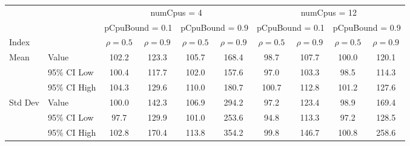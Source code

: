 \begin{tabular}{llc|c|c|c|c|c|c|c}
\toprule
& & \multicolumn{4}{c|}{numCpus = 4} & \multicolumn{4}{c}{numCpus = 12} \\
& & \multicolumn{2}{c|}{pCpuBound = 0.1} & \multicolumn{2}{c|}{pCpuBound = 0.9} & \multicolumn{2}{c|}{pCpuBound = 0.1} & \multicolumn{2}{c}{pCpuBound = 0.9} \\
Index & & $\rho = 0.5$ & $\rho = 0.9$ & $\rho = 0.5$ & $\rho = 0.9$ & $\rho = 0.5$ & $\rho = 0.9$ & $\rho = 0.5$ & $\rho = 0.9$ \\
\midrule
\multirow{3}{*}{Mean} & Value & 102.2 & 123.3 & 105.7 & 168.4 & 98.7 & 107.7 & 100.0 & 120.1 \\
 & 95\% CI Low & 100.4 & 117.7 & 102.0 & 157.6 & 97.0 & 103.3 & 98.5 & 114.3 \\
 & 95\% CI High & 104.3 & 129.6 & 110.0 & 180.7 & 100.7 & 112.8 & 101.2 & 127.6 \\
\midrule
\multirow{3}{*}{Std Dev} & Value & 100.0 & 142.3 & 106.9 & 294.2 & 97.2 & 123.4 & 98.9 & 169.4 \\
 & 95\% CI Low & 97.7 & 129.9 & 101.0 & 253.6 & 94.8 & 113.3 & 97.2 & 128.5 \\
 & 95\% CI High & 102.8 & 170.4 & 113.8 & 354.2 & 99.8 & 146.7 & 100.8 & 258.6 \\
\bottomrule
\end{tabular}
